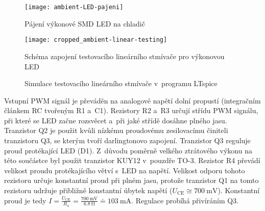 \begin{figure}[htbp]
    \centering
    \texttt{[image: ambient-LED-pajeni]}
    \caption{Pájení výkonové SMD LED na chladič}
    \label{fig:ambient LED pajeni}
\end{figure}



\begin{figure}[htbp]
    \centering
    \texttt{[image: cropped\_ambient-linear-testing]}
    \caption{Schéma zapojení testovacího lineárního stmívače pro výkonovou LED}
    \label{fig:ambient linear testing sch}
\end{figure}

\begin{figure}[htbp]
    \centering
    \caption{Simulace testovacího lineárního stmívače v~programu LTspice}
    \label{fig:ambient linear testing sim}
\end{figure}

Vstupní PWM signál je převáděn na analogové napětí dolní propustí (integračním
článkem RC tvořeným R1 a~C1). Rezistory R2 a~R3 určují střídu PWM
signálu, při které se LED začne rozsvěcet a~při jaké střídě dosáhne plného
jasu. Tranzistor Q2 je použit kvůli nízkému proudovému zesilovacímu činiteli
tranzistoru Q3, se kterým tvoří darlingtonovo zapojení. Tranzistor Q3 reguluje
proud protékající LED (D1). Z~důvodu poměrně velkého ztrátového výkonu na této
součástce byl použit tranzistor KUY12 v~pouzdře TO-3. Rezistor R4 převádí
velikost proudu protékajícího větví s~LED na napětí. Velikost odporu tohoto
rezistoru určuje konstantní proud při plném jasu, protože tranzistor Q1 na
tomto rezistoru udržuje přibližně
konstantní úbytek napětí ($U_\mathrm{CE} \cong \SI{700}{\milli\volt}$).
Konstantní proud je tedy $I = \frac{U_\mathrm{CE}}{R_4} =
\frac{\SI{700}{\milli\volt}}{\SI{6,8}{\ohm}} \doteq \SI{103}{\milli\ampere}$.
Regulace probíhá přivíráním Q3.

\FloatBarrier

